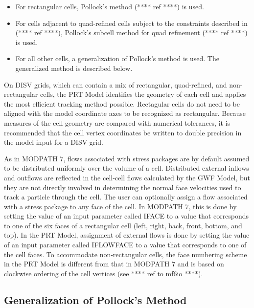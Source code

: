 \begin{itemize}
\item For rectangular cells, Pollock's method {\color{red} (**** ref ****)} is used.
\item For cells adjacent to quad-refined cells subject to the constraints described in {\color{red} (**** ref ****)}, Pollock's subcell method for quad refinement {\color{red} (**** ref ****)} is used.
\item For all other \mf cells, a generalization of Pollock's method is used. The generalized method is described below.
\end{itemize}

\noindent On DISV grids, which can contain a mix of rectangular, quad-refined, and non-rectangular cells, the PRT Model identifies the geometry of each cell and applies the most efficient tracking method possible. Rectagular cells do not need to be aligned with the model coordinate axes to be recognized as rectangular. Because measures of the cell geometry are compared with numerical tolerances, it is recommended that the cell vertex coordinates be written to double precision in the model input for a DISV grid.

As in MODPATH 7, flows associated with stress packages are by default assumed to be distributed uniformly over the volume of a cell. Distributed external inflows and outflows are reflected in the cell-cell flows calculated by the GWF Model, but they are not directly involved in determining the normal face velocities used to track a particle through the cell. The user can optionally assign a flow associated with a stress package to any face of the cell. In MODPATH 7, this is done by setting the value of an input parameter called IFACE to a value that corresponds to one of the six faces of a rectangular cell (left, right, back, front, bottom, and top). In the PRT Model, assignment of external flows is done by setting the value of an input parameter called IFLOWFACE to a value that corresponds to one of the cell faces. To accommodate non-rectangular cells, the face numbering scheme in the PRT Model is different from that in MODPATH 7 and is based on clockwise ordering of the cell vertices (see {\color{red} **** ref to mf6io ****}).

\subsection{Generalization of Pollock's Method} \label{sec:genpollockmethod}

